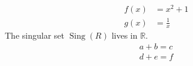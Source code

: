 \newcommand{\R}{\mathbb{R}}
\DeclareMathOperator{\Sing}{Sing}
\begin{align}
  f(x) &= x^2 + 1 \\
  g(x) &= \frac{1}{x}
\end{align}
The singular set $\Sing(R)$ lives in $\R$.
\begin{gather}
  a + b = c \\
  d + e = f
\end{gather}
